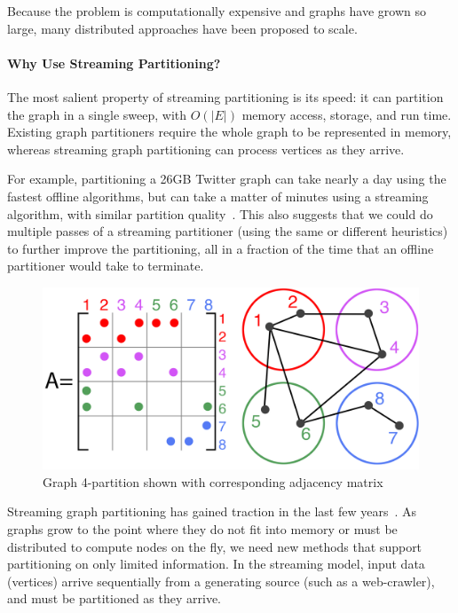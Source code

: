 Because the problem is computationally expensive and graphs have grown so large, many distributed approaches have been proposed to scale.
 

\paragraph{Why Use Streaming Partitioning?}
The most salient property of streaming partitioning is its speed: it can partition the graph in a single sweep, with $O(|E|)$ memory access, storage, and run time. Existing graph partitioners require the whole graph to be represented in memory, whereas streaming graph partitioning can process vertices as they arrive.

For example, partitioning a 26GB Twitter graph can take nearly a day using the fastest offline algorithms, but can take a matter of minutes using a streaming algorithm, with similar partition quality~\cite{tsourakakis2012fennel}.
This also suggests that we could do multiple passes of a streaming partitioner (using the same or different heuristics) to further improve the partitioning, all in a fraction of the time that an offline partitioner would take to terminate.


\begin{figure}[h]
\centering
\includegraphics[width=0.85\columnwidth] {figures/graphpart1.pdf}
\caption[Caption for]{Graph 4-partition shown with corresponding adjacency matrix}
\label{fig:0}
\end{figure}


Streaming graph partitioning has gained traction in the last few years~\cite{DBLP:journals/corr/abs-1212-1121,Stanton:2012:SGP:2339530.2339722,tsourakakis2012fennel}.
As graphs grow to the point where they do not fit into memory or must be distributed to compute nodes on the fly, we need new methods that support partitioning on only limited information.
In the streaming model, input data (vertices) arrive sequentially from a generating source (such as a web-crawler), and must be partitioned as they arrive.

